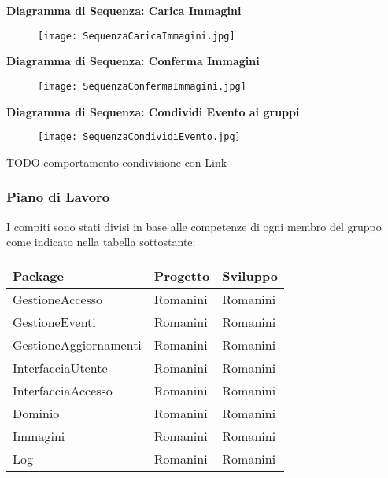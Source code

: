 \textbf{Diagramma di Sequenza: Carica Immagini}

\begin{figure}[h!]
    \begin{center}
        \texttt{[image: SequenzaCaricaImmagini.jpg]}
    \end{center}
\end{figure}
\hfill \break

\textbf{Diagramma di Sequenza: Conferma Immagini}

\begin{figure}[h!]
    \begin{center}
        \texttt{[image: SequenzaConfermaImmagini.jpg]}
    \end{center}
\end{figure}
\hfill \break
\newpage

\textbf{Diagramma di Sequenza: Condividi Evento ai gruppi}

\begin{figure}[h!]
    \begin{center}
        \texttt{[image: SequenzaCondividiEvento.jpg]}
    \end{center}
\end{figure}
\hfill \break

\newpage
TODO
comportamento condivisione con Link
\newpage

\subsubsection{Piano di Lavoro}

I compiti sono stati divisi in base alle competenze di
ogni membro del gruppo come indicato nella tabella sottostante:
\hfill \break

\begin{tabular} {|P{5cm}|P{5cm}|P{5cm}|} %
    \hline
    \textbf{Package}      & \textbf{Progetto} & \textbf{Sviluppo} \\
    \hline
    GestioneAccesso       & Romanini          & Romanini          \\
    \hline
    GestioneEventi        & Romanini          & Romanini          \\
    \hline
    GestioneAggiornamenti & Romanini          & Romanini          \\
    \hline
    InterfacciaUtente     & Romanini          & Romanini          \\
    \hline
    InterfacciaAccesso    & Romanini          & Romanini          \\
    \hline
    Dominio               & Romanini          & Romanini          \\
    \hline
    Immagini              & Romanini          & Romanini          \\
    \hline
    Log                   & Romanini          & Romanini          \\
    \hline
\end{tabular}
\hfill \break

